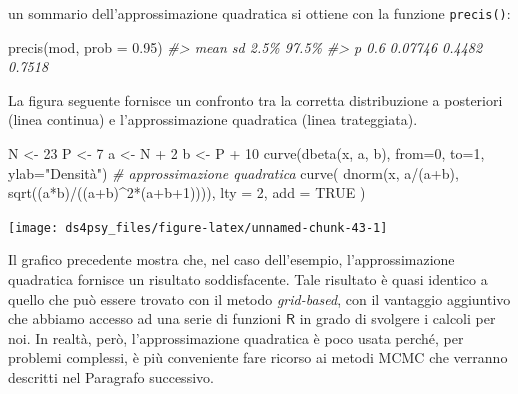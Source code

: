 \documentclass[
  11pt,
]{krantz}
\makeatletter
\newenvironment{Shaded}{\begin{snugshade}}{\end{snugshade}}
\newcommand{\AttributeTok}[1]{\textcolor[rgb]{0.61,0.61,0.61}{#1}}
\newcommand{\CommentTok}[1]{\textcolor[rgb]{0.37,0.37,0.37}{\textit{#1}}}
\newcommand{\ConstantTok}[1]{\textcolor[rgb]{0,0,0}{#1}}
\newcommand{\DecValTok}[1]{\textcolor[rgb]{0.06,0.06,0.06}{#1}}
\newcommand{\FloatTok}[1]{\textcolor[rgb]{0.06,0.06,0.06}{#1}}
\newcommand{\FunctionTok}[1]{\textcolor[rgb]{0,0,0}{#1}}
\newcommand{\NormalTok}[1]{#1}
\newcommand{\OtherTok}[1]{\textcolor[rgb]{0.37,0.37,0.37}{#1}}
\newcommand{\SpecialCharTok}[1]{\textcolor[rgb]{0,0,0}{#1}}
\newcommand{\StringTok}[1]{\textcolor[rgb]{0.5,0.5,0.5}{#1}}
\newenvironment{kframe}{%
\medskip{}
\setlength{\fboxsep}{.8em}
 \def\at@end@of@kframe{}%
 \ifinner\ifhmode%
  \def\at@end@of@kframe{\end{minipage}}%
  \begin{minipage}{\columnwidth}%
 \fi\fi%
 \def\FrameCommand##1{\hskip\@totalleftmargin \hskip-\fboxsep
 \colorbox{shadecolor}{##1}\hskip-\fboxsep
     \hskip-\linewidth \hskip-\@totalleftmargin \hskip\columnwidth}%
 \MakeFramed {\advance\hsize-\width
   \@totalleftmargin\z@ \linewidth\hsize
   \@setminipage}}%
 {\par\unskip\endMakeFramed%
 \at@end@of@kframe}
\renewenvironment{Shaded}{\begin{kframe}}{\end{kframe}}
\newcommand{\R}{\textsf{R}} %
\theoremstyle{definition}
\theoremstyle{definition}
\theoremstyle{definition}
\theoremstyle{definition}
\theoremstyle{remark}
\makeatother
\begin{document}
un sommario dell'approssimazione quadratica si ottiene con la funzione \texttt{precis()}:

\begin{Shaded}
\begin{Highlighting}[]
\FunctionTok{precis}\NormalTok{(mod, }\AttributeTok{prob =} \FloatTok{0.95}\NormalTok{)}
\CommentTok{\#\textgreater{}   mean      sd   2.5\%  97.5\%}
\CommentTok{\#\textgreater{} p  0.6 0.07746 0.4482 0.7518}
\end{Highlighting}
\end{Shaded}

La figura seguente fornisce un confronto tra la corretta distribuzione a posteriori (linea continua) e l'approssimazione quadratica (linea trateggiata).

\begin{Shaded}
\begin{Highlighting}[]
\NormalTok{N }\OtherTok{\textless{}{-}} \DecValTok{23}
\NormalTok{P }\OtherTok{\textless{}{-}} \DecValTok{7}
\NormalTok{a }\OtherTok{\textless{}{-}}\NormalTok{ N }\SpecialCharTok{+} \DecValTok{2}
\NormalTok{b }\OtherTok{\textless{}{-}}\NormalTok{ P }\SpecialCharTok{+} \DecValTok{10}
\FunctionTok{curve}\NormalTok{(}\FunctionTok{dbeta}\NormalTok{(x, a, b), }\AttributeTok{from=}\DecValTok{0}\NormalTok{, }\AttributeTok{to=}\DecValTok{1}\NormalTok{, }\AttributeTok{ylab=}\StringTok{"Densità"}\NormalTok{)}
\CommentTok{\# approssimazione quadratica}
\FunctionTok{curve}\NormalTok{(}
  \FunctionTok{dnorm}\NormalTok{(x, a}\SpecialCharTok{/}\NormalTok{(a}\SpecialCharTok{+}\NormalTok{b), }\FunctionTok{sqrt}\NormalTok{((a}\SpecialCharTok{*}\NormalTok{b)}\SpecialCharTok{/}\NormalTok{((a}\SpecialCharTok{+}\NormalTok{b)}\SpecialCharTok{\^{}}\DecValTok{2}\SpecialCharTok{*}\NormalTok{(a}\SpecialCharTok{+}\NormalTok{b}\SpecialCharTok{+}\DecValTok{1}\NormalTok{)))),}
  \AttributeTok{lty =} \DecValTok{2}\NormalTok{,}
  \AttributeTok{add =} \ConstantTok{TRUE}
\NormalTok{)}
\end{Highlighting}
\end{Shaded}

\begin{center}\texttt{[image: ds4psy\_files/figure-latex/unnamed-chunk-43-1]} \end{center}

Il grafico precedente mostra che, nel caso dell'esempio, l'approssimazione quadratica fornisce un risultato soddisfacente. Tale risultato è quasi identico a quello che può essere trovato con il metodo \emph{grid-based}, con il vantaggio aggiuntivo che abbiamo accesso ad una serie di funzioni \(\R\) in grado di svolgere i calcoli per noi. In realtà, però, l'approssimazione quadratica è poco usata perché, per problemi complessi, è più conveniente fare ricorso ai metodi MCMC che verranno descritti nel Paragrafo successivo.
\end{document}
